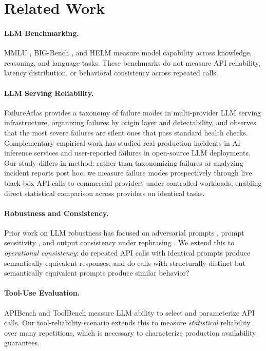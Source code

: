 \documentclass[11pt]{article}
\begin{document}
\section{Related Work}

\paragraph{LLM Benchmarking.} MMLU \citep{hendrycks2021}, BIG-Bench \citep{srivastava2022}, and HELM \citep{liang2022} measure model capability across knowledge, reasoning, and language tasks. These benchmarks do not measure API reliability, latency distribution, or behavioral consistency across repeated calls.

\paragraph{LLM Serving Reliability.} FailureAtlas \citep{pandey2026failureatlas} provides a taxonomy of failure modes in multi-provider LLM serving infrastructure, organizing failures by origin layer and detectability, and observes that the most severe failures are silent ones that pass standard health checks. Complementary empirical work has studied real production incidents in AI inference services and user-reported failures in open-source LLM deployments. Our study differs in method: rather than taxonomizing failures or analyzing incident reports post hoc, we measure failure modes prospectively through live black-box API calls to commercial providers under controlled workloads, enabling direct statistical comparison across providers on identical tasks.

\paragraph{Robustness and Consistency.} Prior work on LLM robustness has focused on adversarial prompts \citep{perez2022}, prompt sensitivity \citep{zhao2021}, and output consistency under rephrasing \citep{elazar2021}. We extend this to \emph{operational consistency}: do repeated API calls with identical prompts produce semantically equivalent responses, and do calls with structurally distinct but semantically equivalent prompts produce similar behavior?

\paragraph{Tool-Use Evaluation.} APIBench \citep{patil2023} and ToolBench \citep{qin2023} measure LLM ability to select and parameterize API calls. Our tool-reliability scenario extends this to measure \emph{statistical} reliability over many repetitions, which is necessary to characterize production availability guarantees.
\end{document}
